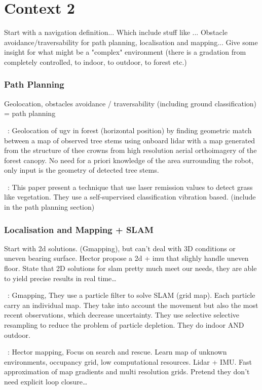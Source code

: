 \section{Context 2}
\label{sec:literature_complex_environments}

Start with a navigation definition... Which include stuff like ... Obstacle avoidance/traversability for path planning, localisation and mapping... 
Give some insight for what might be a "complex" environment (there is a gradation from completely controlled, to indoor, to outdoor, to forest etc.)

\subsubsection{Path Planning}
Geolocation, obstacles avoidance / traversability (including ground classification) = path planning

~\cite{Hussein2015}:
Geolocation of ugv in forest (horizontal position) by finding geometric match between a map of observed tree stems using onboard lidar with a map generated from the structure of thee crowns from high resolution aerial orthoimagery of the forest canopy. No need for a priori knowledge of the area surrounding the robot, only input is the geometry of detected tree stems.

~\cite{Wurm2009}:
This paper present a technique that use laser remission values to detect grass like vegetation. They use a self-supervised classification vibration based. (include in the path planning section)

\subsubsection{Localisation and Mapping + SLAM}
Start with 2d solutions. (Gmapping), but can't deal with 3D conditions or uneven bearing surface. Hector propose a 2d + imu that slighly handle uneven floor.
State that 2D solutions for slam pretty much meet our needs, they are able to yield precise results in real time\dots

~\cite{Grisetti2007}: Gmapping,
They use a particle filter to solve SLAM (grid map). Each particle carry an individual map. They take into account the movement but also the most recent observations, which decrease uncertainty. They use selective selective resampling to reduce the problem of particle depletion. They do indoor AND outdoor. 

~\cite{Kohlbrecher2011}: Hector mapping,
Focus on search and rescue. Learn map of unknown environments, occupancy grid, low computational resources. Lidar + IMU. Fast approximation of map gradients and multi resolution grids. Pretend they don't need explicit loop closure\dots


